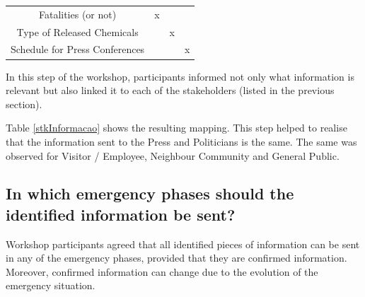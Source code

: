 \begin{table}[]
\begin{tabular}{cccc}
Fatalities (or not)                                                                                                                                                               & x                                                                                                      &                                                              &                                                                 \\
Type of Released Chemicals                                                                                                                                                        &                                                                                                        & x                                                            &                                                                 \\
Schedule for Press Conferences                                                                                                                                                    &                                                                                                        &                                                              & x                                                               \\ \hline
\end{tabular}
\end{table}



In this step of the workshop, participants informed not only what information is relevant but also linked it to each of the stakeholders (listed in the previous section). 

Table \ref{stkInformacao} shows the resulting mapping. This step helped to realise that the information sent to the Press and Politicians is the same. The same was observed for
Visitor / Employee, Neighbour Community and General Public.

\subsection*{In which emergency phases should the identified information be sent?}

Workshop participants agreed that all identified pieces of information can be sent in any of the emergency phases, provided that they are confirmed information. Moreover, confirmed information can change due to the evolution of the emergency situation. 

